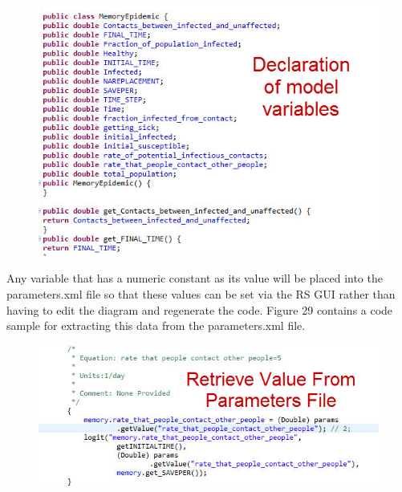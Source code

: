 \documentclass[11pt]{amsart}
\begin{document}
\begin{figure}[ht]
\begin{center}
\vspace{.2in}
\centerline {
\includegraphics[totalheight=0.3\textheight]{images/028.jpg}
}
\caption{}
\label{fig:028}
\end{center}
\end{figure}


Any variable that has a numeric constant as its value will be placed into the parameters.xml file so that these values can be set via the RS GUI rather than having to edit the diagram and regenerate the code. Figure 29 contains a code sample for extracting this data from the parameters.xml file.

\begin{figure}[ht]
\begin{center}
\vspace{.2in}
\centerline {
\includegraphics[totalheight=0.3\textheight]{images/029.jpg}
}
\caption{}
\label{fig:029}
\end{center}
\end{figure}
\end{document}
